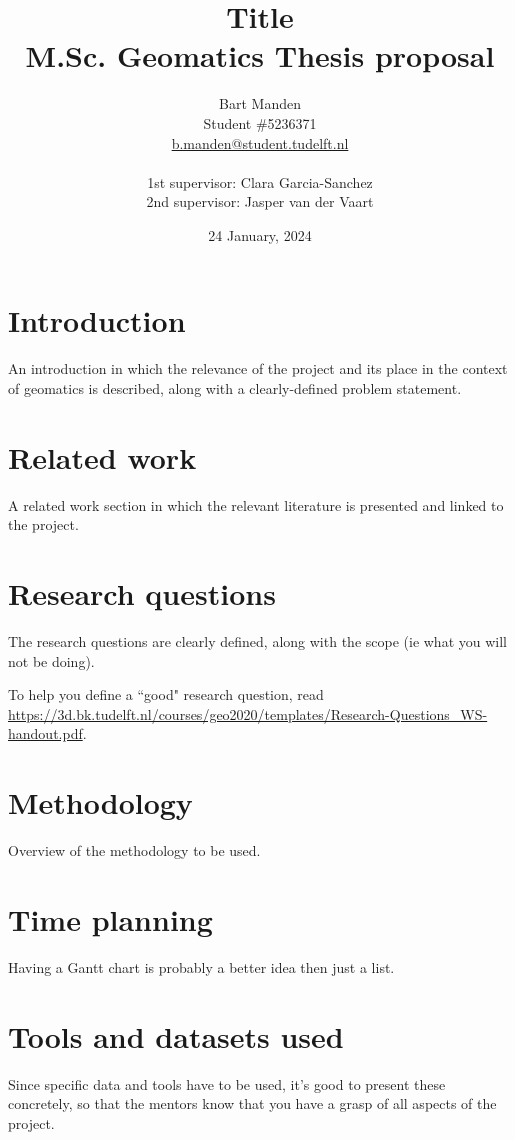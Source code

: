 \documentclass[a4paper,11pt]{scrartcl}
\title{Title\\ \normalsize \vspace{4mm} M.Sc. Geomatics Thesis proposal}
\author{
  Bart Manden\\
  Student \#5236371 \\
  \url{b.manden@student.tudelft.nl}\\
  \\
  1st supervisor: Clara Garcia-Sanchez \\
  2nd supervisor: Jasper van der Vaart \\
}
\date{24 January, 2024}
\begin{document}
\maketitle
\newpage

%
\section{Introduction}
An introduction in which the relevance of the project and its place in the context of geomatics is described, along with a clearly-defined problem statement.

%
\section{Related work}
A related work section in which the relevant literature is presented and linked to the project.

%
\section{Research questions}
The research questions are clearly defined, along with the scope (ie what you will not be doing).

To help you define a ``good" research question, read \url{https://3d.bk.tudelft.nl/courses/geo2020/templates/Research-Questions_WS-handout.pdf}.



%
\section{Methodology}
Overview of the methodology to be used.

%
\section{Time planning}
Having a Gantt chart is probably a better idea then just a list.

%
\section{Tools and datasets used}
Since specific data and tools have to be used, it’s good to present these concretely, so that the mentors know that you have a grasp of all aspects of the project.



\end{document}
